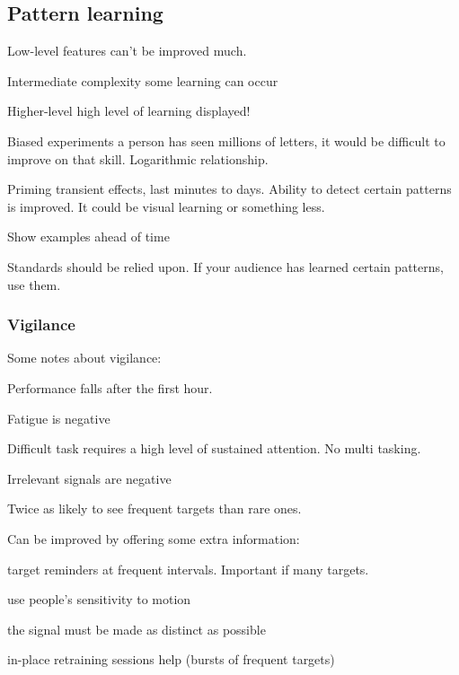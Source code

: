 \begin{mdframed}\begin{multicols}{2}
\subsection{Pattern learning}
\begin{compactdesc}
    \item[Low-level features] can't be improved much.
    \item[Intermediate complexity] some learning can occur
    \item[Higher-level] high level of learning displayed!
    \item[Biased experiments] a person has seen millions of letters, it
        would be difficult to improve on that skill. Logarithmic relationship.
    \item[Priming] transient effects, last minutes to days. Ability to
        detect certain patterns is improved. It could be visual learning or
        something less.
    \item[Show examples ahead of time]
    \item[Standards] should be relied upon. If your audience has learned
        certain patterns, use them.
\end{compactdesc}

\subsubsection{Vigilance}
\begin{compactdesc}
    \item[Some notes] about vigilance:
    \begin{compactenum}
        \item Performance falls after the first hour.
        \item Fatigue is negative
        \item Difficult task requires a high level of sustained attention.
            No multi tasking.
        \item Irrelevant signals are negative
        \item Twice as likely to see frequent targets than rare ones.
    \end{compactenum}
    \item[Can be improved by] offering some extra information:
    \begin{compactenum}
        \item target reminders at frequent intervals. Important if
            many targets.
        \item use people's sensitivity to motion
        \item the signal must be made as distinct as possible
        \item in-place retraining sessions help (bursts of frequent targets)
    \end{compactenum}

\end{compactdesc}
\end{multicols}\end{mdframed}



